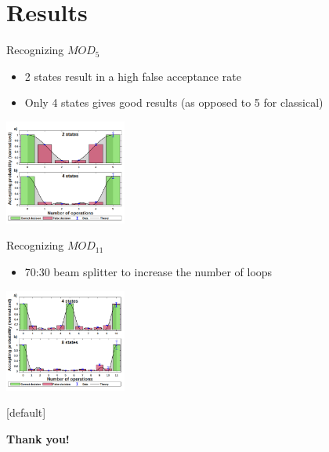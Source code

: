 \documentclass[aspectratio=169,9pt]{beamer}
\begin{document}
\section{Results}
\begin{frame}[t]{Recognizing $MOD_5$}
  \begin{itemize}
    \item 2 states result in a high false acceptance rate
    \item Only 4 states gives good results (as opposed to 5 for classical)
  \end{itemize}
  \includegraphics[width=0.3\textwidth]{2states_4states.png}
\end{frame}


\begin{frame}[t]{Recognizing $MOD_{11}$}
  \begin{itemize}
    \item 70:30 beam splitter to increase the number of loops
  \end{itemize}
  \includegraphics[width=0.3\textwidth]{4states_8states.png}
\end{frame}




{ %
\makeatletter %
    [default] %
    \def\beamer@entrycode{\vspace*{-\headheight}} %
\makeatother
\begin{frame}
  \begin{center}
    \textbf{\Large Thank you!}
  \end{center}
\end{frame}
}





\end{document}
